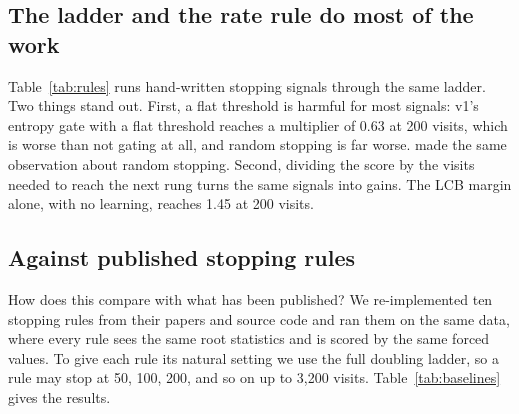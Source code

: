 \begin{table}[t]
\centering\small

\caption{Learned stopping on the 50/200/800/3{,}200 ladder, cross-fitted by game. \emph{Equivalent uniform visits} is the fixed budget with the same mean regret. The oracle stops with knowledge of the true regret.}
\label{tab:frontier}
\end{table}

\subsection{The ladder and the rate rule do most of the work}

Table~\ref{tab:rules} runs hand-written stopping signals through the same ladder. Two things stand out. First, a flat threshold is harmful for most signals: v1's entropy gate with a flat threshold reaches a multiplier of 0.63 at 200 visits, which is worse than not gating at all, and random stopping is far worse. \citet{lan2021learning} made the same observation about random stopping. Second, dividing the score by the visits needed to reach the next rung turns the same signals into gains. The LCB margin alone, with no learning, reaches 1.45 at 200 visits.

\begin{table}[t]
\centering\small

\caption{Compute multipliers (continuation cost) for stopping signals on the 50/200/800/3{,}200 ladder. Values below 1 are worse than uniform search.}
\label{tab:rules}
\end{table}

\subsection{Against published stopping rules}
\label{sec:baselines}

How does this compare with what has been published? We re-implemented ten stopping rules from their papers and source code and ran them on the same data, where every rule sees the same root statistics and is scored by the same forced values. To give each rule its natural setting we use the full doubling ladder, so a rule may stop at 50, 100, 200, and so on up to 3{,}200 visits. Table~\ref{tab:baselines} gives the results.

\begin{table}[t]
\centering\footnotesize
\resizebox{\linewidth}{!}{}
\caption{Compute multipliers on the doubling ladder, with 95\% bootstrap intervals over games. Rules with a threshold are swept and shown at their best point for each mean budget. Rules without one are shown at the configuration nearest the budget, with its mean cost in visits. The last column applies the rate rule to the same signal where that is possible.}
\label{tab:baselines}
\end{table}

